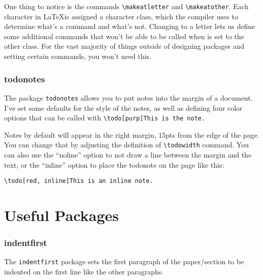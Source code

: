 \documentclass[12pt]{article}
\begin{document}
    One thing to notice is the commands \texttt{\textbackslash makeatletter} and \texttt{\textbackslash makeatother}. Each character in \LaTeX is assigned a character class, which the compiler uses to determine what's a command and what's not. Changing \@ to a letter lets us define some additional commands that won't be able to be called when \@ is set to the other class. For the vast majority of things outside of designing packages and setting certain commands, you won't need this. 

\subsubsection{todonotes}

    The package \texttt{todonotes} allows you to put notes into the margin of a document. I've set some defaults for the style of the notes, as well as defining four color options that can be called with \texttt{\textbackslash todo[purp]{This is the note.}} 

    Notes by default will appear in the right margin, 15pts from the edge of the page. You can change that by adjusting the definition of \texttt{\textbackslash todowidth} command. You can also use the ``noline'' option to not draw a line between the margin and the text, or the ``inline'' option to place the todonote on the page like this:

    \texttt{\textbackslash todo[red, inline]{This is an inline note.}}

\section{Useful Packages}

\subsubsection{indentfirst}

        The \texttt{indentfirst} package sets the first paragraph of the paper/section to be indented on the first line like the other paragraphs. 

\end{document}
